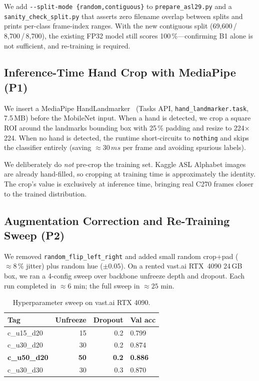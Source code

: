 \documentclass[sigconf,nonacm]{acmart}
\begin{document}
We add \texttt{-{}-split-mode \{random,contiguous\}} to
\texttt{prepare\_asl29.py} and a \texttt{sanity\_check\_split.py} that
asserts zero filename overlap between splits and prints per-class
frame-index ranges.  With the new contiguous split
(69,600\,/\,8,700\,/\,8,700), the existing FP32 model still scores
100\,\%---confirming B1 alone is not sufficient, and re-training is
required.

\subsection{Inference-Time Hand Crop with MediaPipe (P1)}

We insert a MediaPipe HandLandmarker~\cite{lugaresi2019mediapipe,zhang2020mediapipehands} (Tasks API,
\texttt{hand\_landmarker.task}, 7.5\,MB) before the MobileNet input.
When a hand is detected, we crop a square ROI around the landmarks
bounding box with 25\,\% padding and resize to 224${\times}$224.  When
no hand is detected, the runtime short-circuits to \texttt{nothing} and
skips the classifier entirely (saving ${\approx}30\,ms$ per frame and
avoiding spurious labels).

We deliberately do \emph{not} pre-crop the training set.  Kaggle ASL
Alphabet images are already hand-filled, so cropping at training time
is approximately the identity.  The crop's value is exclusively at
inference time, bringing real C270 frames closer to the trained
distribution.

\subsection{Augmentation Correction and Re-Training Sweep (P2)}

We removed \texttt{random\_flip\_left\_right} and added small random
crop+pad (${\approx}8\,\%$ jitter) plus random hue (${\pm}0.05$).  On a
rented vast.ai RTX~4090 24\,GB box, we ran a 4-config sweep over
backbone unfreeze depth and dropout.  Each run completed in
${\approx}6$ min; the full sweep in ${\approx}25$ min.

\begin{table}[h]
\caption{Hyperparameter sweep on vast.ai RTX 4090.}
\label{tab:sweep}
\begin{tabular}{lrrl}
\toprule
Tag & Unfreeze & Dropout & Val acc \\
\midrule
c\_u15\_d20 & 15  & 0.2 & 0.799 \\
c\_u30\_d20 & 30  & 0.2 & 0.874 \\
\textbf{c\_u50\_d20} & \textbf{50} & \textbf{0.2} & \textbf{0.886} \\
c\_u30\_d30 & 30  & 0.3 & 0.870 \\
\bottomrule
\end{tabular}
\end{table}
\end{document}
